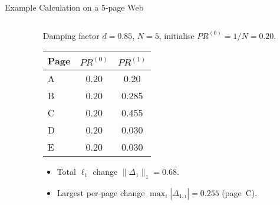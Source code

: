 \documentclass{beamer}
\begin{document}
\begin{frame}{Example Calculation on a 5‑page Web}
\begin{columns}[T,totalwidth=\textwidth]
  \begin{column}{0.45\textwidth}
  \centering
  \end{column}
  \begin{column}{0.55\textwidth}
  \small
  Damping factor $d=0.85$, $N=5$, initialise $PR^{(0)}=1/N=0.20$.

  \medskip
  \begin{tabular}{lcc}
    \toprule
    Page & $PR^{(0)}$ & $PR^{(1)}$ \\\midrule
    A & 0.20 & 0.20 \\
    B & 0.20 & 0.285 \\
    C & 0.20 & 0.455 \\
    D & 0.20 & 0.030 \\
    E & 0.20 & 0.030 \\\bottomrule
  \end{tabular}

  \medskip
  \begin{itemize}
    \item Total $\ell_1$ change $\|\Delta_1\|_1 = 0.68$.
    \item Largest per‑page change $\max_i |\Delta_{1,i}| = 0.255$ (page~C).
  \end{itemize}
  \end{column}
\end{columns}
\end{frame}
\end{document}
